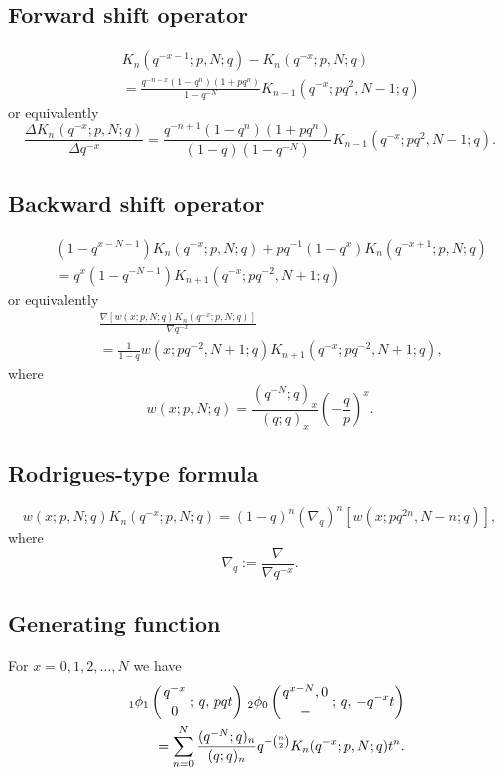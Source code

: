 \documentclass[envcountchap,graybox]{svmono}
\newcommand{\qhyp}[5]{\mbox{}_{#1}{\phi}_{#2}
\left(\genfrac{}{}{0pt}{}{#3}{#4}\,;\,q,\,#5\right)}
\newcommand{\qhyp}[5]{\,\mbox{}_{#1}\phi_{#2}\!\left(
  \genfrac{}{}{0pt}{}{#3}{#4};#5\right)}
\begin{document}
\subsection*{Forward shift operator}
\begin{eqnarray}
\label{shift1qKrawtchoukI}
& &K_n(q^{-x-1};p,N;q)-K_n(q^{-x};p,N;q)\nonumber\\
& &{}=\frac{q^{-n-x}(1-q^n)(1+pq^n)}{1-q^{-N}}K_{n-1}(q^{-x};pq^2,N-1;q)
\end{eqnarray}
or equivalently
\begin{equation}
\label{shift1qKrawtchoukII}
\frac{\Delta K_n(q^{-x};p,N;q)}{\Delta q^{-x}}=
\frac{q^{-n+1}(1-q^n)(1+pq^n)}{(1-q)(1-q^{-N})}K_{n-1}(q^{-x};pq^2,N-1;q).
\end{equation}

\subsection*{Backward shift operator}
\begin{eqnarray}
\label{shift2qKrawtchoukI}
& &(1-q^{x-N-1})K_n(q^{-x};p,N;q)+pq^{-1}(1-q^x)K_n(q^{-x+1};p,N;q)\nonumber\\
& &{}=q^x(1-q^{-N-1})K_{n+1}(q^{-x};pq^{-2},N+1;q)
\end{eqnarray}
or equivalently
\begin{eqnarray}
\label{shift2qKrawtchoukII}
& &\frac{\nabla\left[w(x;p,N;q)K_n(q^{-x};p,N;q)\right]}{\nabla q^{-x}}\nonumber\\
& &{}=\frac{1}{1-q}w(x;pq^{-2},N+1;q)K_{n+1}(q^{-x};pq^{-2},N+1;q),
\end{eqnarray}
where
$$w(x;p,N;q)=\frac{(q^{-N};q)_x}{(q;q)_x}\left(-\frac{q}{p}\right)^x.$$

\subsection*{Rodrigues-type formula}
\begin{equation}
\label{RodqKrawtchouk}
w(x;p,N;q)K_n(q^{-x};p,N;q)=(1-q)^n\left(\nabla_q\right)^n\left[w(x;pq^{2n},N-n;q)\right],
\end{equation}
where
$$\nabla_q:=\frac{\nabla}{\nabla q^{-x}}.$$

\subsection*{Generating function} For $x=0,1,2,\ldots,N$ we have
\begin{eqnarray}
\label{GenqKrawtchouk}
& &\qhyp{1}{1}{q^{-x}}{0}{pqt}\,\qhyp{2}{0}{q^{x-N},0}{-}{-q^{-x}t}\nonumber\\
& &{}=\sum_{n=0}^N\frac{(q^{-N};q)_n}{(q;q)_n}q^{-\binom{n}{2}}K_n(q^{-x};p,N;q)t^n.
\end{eqnarray}
\end{document}
